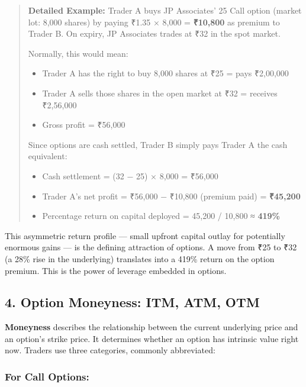 \documentclass[12pt,openany]{book}
\begin{document}
\begin{quote}
\textbf{Detailed Example:} Trader A buys JP Associates' 25 Call option (market lot: 8,000 shares) by paying ₹1.35 × 8,000 = \textbf{₹10,800} as premium to Trader B. On expiry, JP Associates trades at ₹32 in the spot market.

Normally, this would mean:
\begin{itemize}[leftmargin=*]
    \item Trader A has the right to buy 8,000 shares at ₹25 = pays ₹2,00,000
    \item Trader A sells those shares in the open market at ₹32 = receives ₹2,56,000
    \item Gross profit = ₹56,000
\end{itemize}

Since options are cash settled, Trader B simply pays Trader A the cash equivalent:
\begin{itemize}[leftmargin=*]
    \item Cash settlement = (32 − 25) × 8,000 = ₹56,000
    \item Trader A's net profit = ₹56,000 − ₹10,800 (premium paid) = \textbf{₹45,200}
    \item Percentage return on capital deployed = 45,200 / 10,800 ≈ \textbf{419\%}
\end{itemize}
\end{quote}

This asymmetric return profile — small upfront capital outlay for potentially enormous gains — is the defining attraction of options. A move from ₹25 to ₹32 (a 28\% rise in the underlying) translates into a 419\% return on the option premium. This is the power of leverage embedded in options.


\subsection{4. Option Moneyness: ITM, ATM, OTM}

\textbf{Moneyness} describes the relationship between the current underlying price and an option's strike price. It determines whether an option has intrinsic value right now. Traders use three categories, commonly abbreviated:

\subsubsection{For Call Options:}
\end{document}
